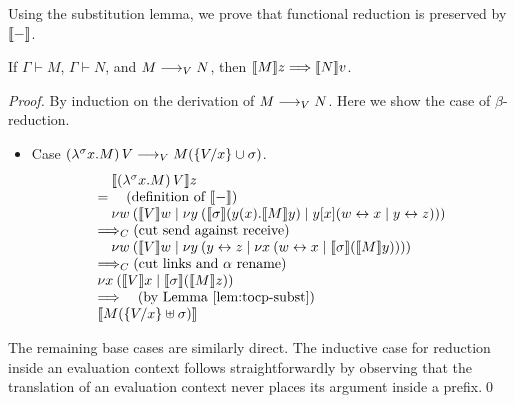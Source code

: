 \documentclass[oribibl,orivec,envcountsame]{llncs}
\begin{document}

Using the substitution lemma, we prove that functional reduction is preserved by $\tocp{-}$.
%
\begin{theorem}
\label{thm:teval-preserved}
If $\Gamma \vdash M$, $\Gamma \vdash N$, and $M \teval N$, then $\tocp{M}z
\bigrto \tocp{N}v$.
\end{theorem}
%
\begin{proof}
By induction on the derivation of $M \teval N$. Here we show the case of $\beta$-reduction.
\begin{itemize}
\item Case $(\lambda^\sigma x.M)\,V \teval M(\{\bind x V\} \cup \sigma)$.
\[
\bl
\quad \tocp{(\lambda^\sigma x.M)\,V}z \\
= \quad (\text{definition of }\tocp{-}) \\
\quad \cut{w}{}{\tocp{V}w}{\cut{y}{}{\tocp{\sigma}(y(x).\tocp{M}y)}{y[x](\link{w}{x} \mid \link{y}{z})}} \\
\bigcrto (\text{cut send against receive}) \\
\quad \cut{w}{}{\tocp{V}w}{\cut{y}{}{\link{y}{z}}{\cut{x}{}{\link{w}{x}}{\tocp{\sigma}(\tocp{M}y)}}} \\
\bigcrto (\text{cut links and $\alpha$ rename}) \\
\cut{x}{}{\tocp{V}x}{\tocp{\sigma}(\tocp{M}z)} \\
\bigrto \quad (\text{by \lemref{tocp-subst}}) \\
\tocp{M(\{\bind x V\} \uplus \sigma)}
\el
\]
\end{itemize}
The remaining base cases are similarly direct. The inductive case for reduction inside an evaluation
context follows straightforwardly by observing that the translation of an evaluation context never
places its argument inside a prefix.\qed
\end{proof}
\end{document}

